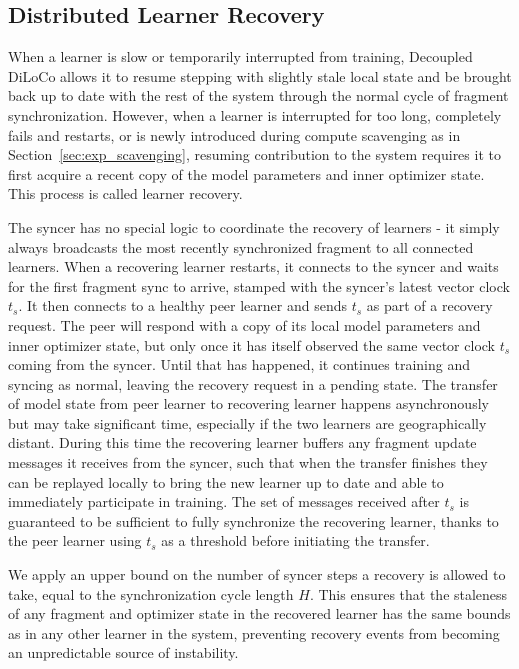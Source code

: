 \documentclass[11pt, a4paper, twocolumn, copyright, google]{google}
\begin{document}
\subsection{Distributed Learner Recovery}\label{sec:recovery}


When a learner is slow or temporarily interrupted from training, Decoupled DiLoCo allows it to resume stepping with slightly stale local state and be brought back up to date with the rest of the system through the normal cycle of fragment synchronization. However, when a learner is interrupted for too long, completely fails and restarts, or is newly introduced during compute scavenging as in Section~\ref{sec:exp_scavenging}, resuming contribution to the system requires it to first acquire a recent copy of the model parameters and inner optimizer state. This process is called learner recovery.

The syncer has no special logic to coordinate the recovery of learners - it simply always broadcasts the most recently synchronized fragment to all connected learners. When a recovering learner restarts, it connects to the syncer and waits for the first fragment sync to arrive, stamped with the syncer's latest vector clock $t_s$. It then connects to a healthy peer learner and sends $t_s$ as part of a recovery request. The peer will respond with a copy of its local model parameters and inner optimizer state, but only once it has itself observed the same vector clock $t_s$ coming from the syncer. Until that has happened, it continues training and syncing as normal, leaving the recovery request in a pending state. The transfer of model state from peer learner to recovering learner happens asynchronously but may take significant time, especially if the two learners are geographically distant. During this time the recovering learner buffers any fragment update messages it receives from the syncer, such that when the transfer finishes they can be replayed locally to bring the new learner up to date and able to immediately participate in training. The set of messages received after $t_s$ is guaranteed to be sufficient to fully synchronize the recovering learner, thanks to the peer learner using $t_s$ as a threshold before initiating the transfer.

We apply an upper bound on the number of syncer steps a recovery is allowed to take, equal to the synchronization cycle length $H$. This ensures that the staleness of any fragment and optimizer state in the recovered learner has the same bounds as in any other learner in the system, preventing recovery events from becoming an unpredictable source of instability.
\end{document}
